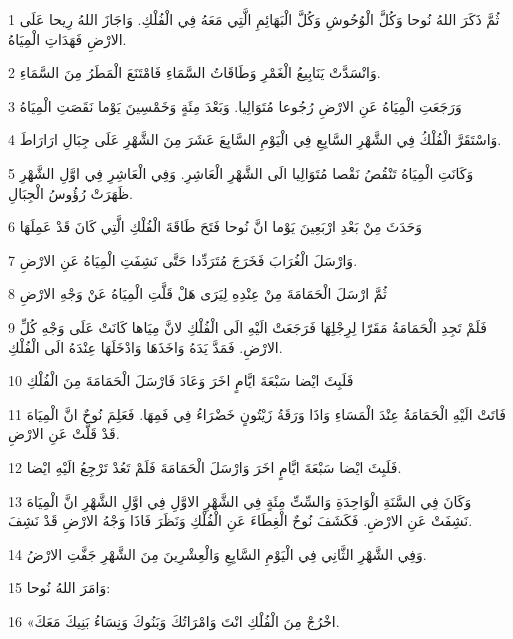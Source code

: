 \par 1 ثُمَّ ذَكَرَ اللهُ نُوحا وَكُلَّ الْوُحُوشِ وَكُلَّ الْبَهَائِمِ الَّتِي مَعَهُ فِي الْفُلْكِ. وَاجَازَ اللهُ رِيحا عَلَى الارْضِ فَهَدَاتِ الْمِيَاهُ.
\par 2 وَانْسَدَّتْ يَنَابِيعُ الْغَمْرِ وَطَاقَاتُ السَّمَاءِ فَامْتَنَعَ الْمَطَرُ مِنَ السَّمَاءِ.
\par 3 وَرَجَعَتِ الْمِيَاهُ عَنِ الارْضِ رُجُوعا مُتَوَالِيا. وَبَعْدَ مِئَةٍ وَخَمْسِينَ يَوْما نَقَصَتِ الْمِيَاهُ
\par 4 وَاسْتَقَرَّ الْفُلْكُ فِي الشَّهْرِ السَّابِعِ فِي الْيَوْمِ السَّابِعَ عَشَرَ مِنَ الشَّهْرِ عَلَى جِبَالِ ارَارَاطَ.
\par 5 وَكَانَتِ الْمِيَاهُ تَنْقُصُ نَقْصا مُتَوَالِيا الَى الشَّهْرِ الْعَاشِرِ. وَفِي الْعَاشِرِ فِي اوَّلِ الشَّهْرِ ظَهَرَتْ رُؤُوسُ الْجِبَالِ.
\par 6 وَحَدَثَ مِنْ بَعْدِ ارْبَعِينَ يَوْما انَّ نُوحا فَتَحَ طَاقَةَ الْفُلْكِ الَّتِي كَانَ قَدْ عَمِلَهَا
\par 7 وَارْسَلَ الْغُرَابَ فَخَرَجَ مُتَرَدِّدا حَتَّى نَشِفَتِ الْمِيَاهُ عَنِ الارْضِ.
\par 8 ثُمَّ ارْسَلَ الْحَمَامَةَ مِنْ عِنْدِهِ لِيَرَى هَلْ قَلَّتِ الْمِيَاهُ عَنْ وَجْهِ الارْضِ
\par 9 فَلَمْ تَجِدِ الْحَمَامَةُ مَقَرّا لِرِجْلِهَا فَرَجَعَتْ الَيْهِ الَى الْفُلْكِ لانَّ مِيَاها كَانَتْ عَلَى وَجْهِ كُلِّ الارْضِ. فَمَدَّ يَدَهُ وَاخَذَهَا وَادْخَلَهَا عِنْدَهُ الَى الْفُلْكِ.
\par 10 فَلَبِثَ ايْضا سَبْعَةَ ايَّامٍ اخَرَ وَعَادَ فَارْسَلَ الْحَمَامَةَ مِنَ الْفُلْكِ
\par 11 فَاتَتْ الَيْهِ الْحَمَامَةُ عِنْدَ الْمَسَاءِ وَاذَا وَرَقَةُ زَيْتُونٍ خَضْرَاءُ فِي فَمِهَا. فَعَلِمَ نُوحٌ انَّ الْمِيَاهَ قَدْ قَلَّتْ عَنِ الارْضِ.
\par 12 فَلَبِثَ ايْضا سَبْعَةَ ايَّامٍ اخَرَ وَارْسَلَ الْحَمَامَةَ فَلَمْ تَعُدْ تَرْجِعُ الَيْهِ ايْضا.
\par 13 وَكَانَ فِي السَّنَةِ الْوَاحِدَةِ وَالسِّتِّ مِئَةٍ فِي الشَّهْرِ الاوَّلِ فِي اوَّلِ الشَّهْرِ انَّ الْمِيَاهَ نَشِفَتْ عَنِ الارْضِ. فَكَشَفَ نُوحٌ الْغِطَاءَ عَنِ الْفُلْكِ وَنَظَرَ فَاذَا وَجْهُ الارْضِ قَدْ نَشِفَ.
\par 14 وَفِي الشَّهْرِ الثَّانِي فِي الْيَوْمِ السَّابِعِ وَالْعِشْرِينَ مِنَ الشَّهْرِ جَفَّتِ الارْضُ.
\par 15 وَامَرَ اللهُ نُوحا:
\par 16 «اخْرُجْ مِنَ الْفُلْكِ انْتَ وَامْرَاتُكَ وَبَنُوكَ وَنِسَاءُ بَنِيكَ مَعَكَ.
